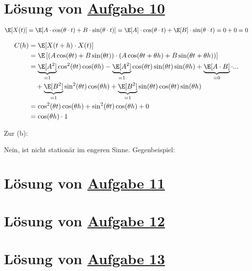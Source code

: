 \section{Lösung von 
	\texorpdfstring{\hyperref[aufg:10]{Aufgabe 10}}{}
}\label{loes:10}


\begin{align*}
\E[X(t)]
=\E[A\cdot\cos(\theta\cdot t)+B\cdot\sin(\theta\cdot t)]
=\E[A]\cdot\cos(\theta\cdot t)+\E[B]\cdot\sin(\theta\cdot t)
=0+0=0
\end{align*}

\begin{align*}
C(h) &=
\E[X(t+h)\cdot X(t)] \\
&=\E\left[(A\cos(\theta t)+B\sin(\theta t))\cdot(A\cos(\theta t+\theta h)+B\sin(\theta t+\theta h))\right]\\
&=\underbrace{\E[A^2]}_{=1}\cos^2(\theta t)\cos(\theta h)
-\underbrace{\E[A^2]}_{=1}\cos(\theta t)\sin(\theta t)\sin(\theta h)+\underbrace{\E[A\cdot B]}_{=0}\cdot...\\
&~~~+\underbrace{\E[B^2]}_{=1}\sin^2(\theta t)\cos(\theta h)+\underbrace{\E[B^2]}_{=1}\sin(\theta t)\cos(\theta t)\sin(\theta h)\\
&=\cos^2(\theta t)\cos(\theta h)+\sin^2(\theta t)\cos(\theta h)+0\\
&=\cos(\theta h)\cdot 1
\end{align*}

Zur (b):

Nein, ist nicht stationär im engeren Sinne. Gegenbeispiel:

\section{Lösung von 
	\texorpdfstring{\hyperref[aufg:11]{Aufgabe 11}}{}
}\label{loes:11}


\section{Lösung von 
	\texorpdfstring{\hyperref[aufg:12]{Aufgabe 12}}{}
}\label{loes:12}

\section{Lösung von 
	\texorpdfstring{\hyperref[aufg:13]{Aufgabe 13}}{}
}\label{loes:13}


